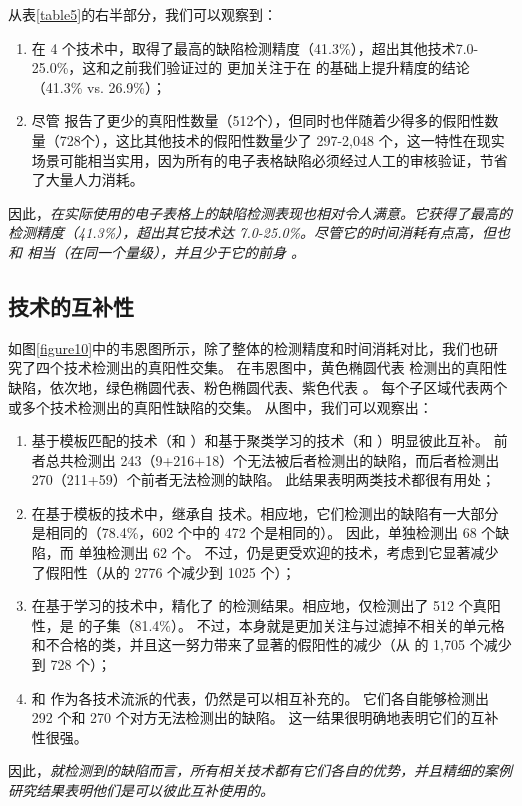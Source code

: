 


从表\ref{table5}的右半部分，我们可以观察到：
\begin{enumerate}
    \item 在 4 个技术中，\wa 取得了最高的缺陷检测精度（41.3\%），超出其他技术7.0-25.0\%，这和之前我们验证过的 \wa 更加关注于在 \cu 的基础上提升精度的结论（41.3\% vs. 26.9\%）；
    \item 尽管 \wa 报告了更少的真阳性数量（512个），但同时也伴随着少得多的假阳性数量（728个），这比其他技术的假阳性数量少了 297-2,048 个，这一特性在现实场景可能相当实用，因为所有的电子表格缺陷必须经过人工的审核验证，节省了大量人力消耗。
\end{enumerate}

因此，\textit{\wa 在实际使用的电子表格上的缺陷检测表现也相对令人满意。它获得了最高的检测精度（41.3\%），超出其它技术达 7.0-25.0\%。尽管它的时间消耗有点高，但也和 \ca 相当（在同一个量级），并且少于它的前身 \cu。}

\subsection{技术的互补性}
如图\ref{figure10}中的韦恩图所示，除了整体的检测精度和时间消耗对比，我们也研究了四个技术检测出的真阳性交集。
在韦恩图中，黄色椭圆代表 \am 检测出的真阳性缺陷，依次地，绿色椭圆代表\ca 、粉色椭圆代表\cu 、紫色代表 \wa 。
每个子区域代表两个或多个技术检测出的真阳性缺陷的交集。
从图中，我们可以观察出：
\begin{enumerate}
    \item 基于模板匹配的技术（\am 和 \ca）和基于聚类学习的技术（\cu 和 \wa）明显彼此互补。
    前者总共检测出 243（9+216+18）个无法被后者检测出的缺陷，而后者检测出 270（211+59）个前者无法检测的缺陷。
    此结果表明两类技术都很有用处；

    \item 在基于模板的技术中，\ca 继承自 \am 技术。相应地，它们检测出的缺陷有一大部分是相同的（78.4\%，602 个中的 472 个是相同的）。
    因此，\am 单独检测出 68 个缺陷，而 \ca 单独检测出 62 个。
    不过，\ca 仍是更受欢迎的技术，考虑到它显著减少了假阳性（从\am 的 2776 个减少到 1025 个）；
    
    \item 在基于学习的技术中，\wa 精化了 \cu 的检测结果。相应地，\wa 仅检测出了 512 个真阳性，是 \cu 的子集（81.4\%）。
    不过，\wa 本身就是更加关注与过滤掉不相关的单元格和不合格的类，并且这一努力带来了显著的假阳性的减少（从 \cu 的 1,705 个减少到 728 个）；
    
    \item \ca 和 \wa 作为各技术流派的代表，仍然是可以相互补充的。
    它们各自能够检测出 292 个和 270 个对方无法检测出的缺陷。
    这一结果很明确地表明它们的互补性很强。
\end{enumerate}

因此，\textit{就检测到的缺陷而言，所有相关技术都有它们各自的优势，并且精细的案例研究结果表明他们是可以彼此互补使用的。}
